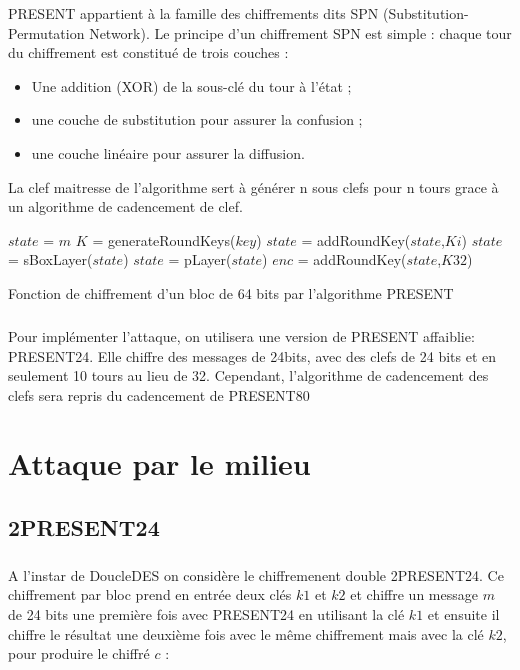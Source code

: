\documentclass{report}
\begin{document}
PRESENT appartient à la famille des chiffrements dits SPN (Substitution-Permutation Network). Le principe
d’un chiffrement SPN est simple : chaque tour du chiffrement est constitué de trois couches :
\begin{itemize}
    \item Une addition (XOR) de la sous-clé du tour à l’état ;
    \item une couche de substitution pour assurer la confusion ;
    \item une couche linéaire pour assurer la diffusion.
\end{itemize}

La clef maitresse de l'algorithme sert à générer n sous clefs pour n tours grace à un algorithme de cadencement de clef.

\begin{algorithm}

    

    $state$ = $m$\;
    $K$ = generateRoundKeys($key$)\;
      {
        $state$ = addRoundKey($state$,$Ki$)\;
        $state$ = sBoxLayer($state$)\;
        $state$ = pLayer($state$)\;
      }
      $enc$ = addRoundKey($state$,$K32$)\;
    \caption{Fonction de chiffrement d'un bloc de 64 bits par l'algorithme PRESENT}
\end{algorithm}

\paragraph{} Pour implémenter l'attaque, on utilisera une version de PRESENT affaiblie: PRESENT24. 
Elle chiffre des messages de 24bits, avec des clefs de 24 bits et en seulement 10 tours au lieu de 32.
Cependant, l'algorithme de cadencement des clefs sera repris du cadencement de PRESENT80 

\chapter{Attaque par le milieu }
\section{ 2PRESENT24 } 
\paragraph{} A l'instar de DoucleDES on considère le chiffremenent double 2PRESENT24. Ce chiffrement par bloc
prend en entrée deux clés $k1$ et $k2$ et chiffre un message $m$ de 24 bits une première fois avec PRESENT24
en utilisant la clé $k1$ et ensuite il chiffre le résultat une deuxième fois avec le même chiffrement mais avec
la clé $k2$, pour produire le chiffré $c$ :
\end{document}
